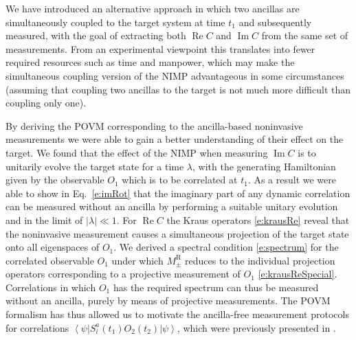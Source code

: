 \documentclass[epjST,numbook]{svjour}
\newcommand{\matel}[3]{ \displaystyle \left\langle #1 \right \vert #2 \left\vert  #3 \right\rangle }
\DeclareMathOperator{\imp }{\mathrm{Im}}
\DeclareMathOperator{\rep}{\mathrm{Re}}
\begin{document}
We have introduced an alternative approach in which two ancillas are simultaneously coupled to the target system at time $t_1$ and subsequently measured, with the goal of extracting both $\rep C$ and $\imp C$ from the same set of measurements. From an experimental viewpoint this translates into fewer required resources such as time and manpower, which may make the simultaneous coupling version of the NIMP advantageous in some circumstances (assuming that coupling two ancillas to the target is not much more difficult than coupling only one).

By deriving the POVM corresponding to the ancilla-based noninvasive measurements we were able to gain a better understanding of their effect on the target. We found that the effect of the NIMP when measuring $\imp C$ is to unitarily evolve the target state for a time $\lambda$, with the generating Hamiltonian given by the observable $O_1$ which is to be correlated at $t_1$. As a result we were able to show in Eq.~\eqref{e:imRot} that the imaginary part of any dynamic correlation can be measured without an ancilla by performing a suitable unitary evolution and in the limit of $|\lambda|\ll 1$.
For $\rep C$ the Kraus operators \eqref{e:krausRe} reveal that the noninvasive measurement causes a simultaneous projection of the target state onto all eigenspaces of $O_1$. We derived a spectral condition \eqref{e:spectrum} for the correlated observable $O_1$ under which $M_\pm^\text{R}$ reduces to the individual projection operators corresponding to a projective measurement of $O_1$ \eqref{e:krausReSpecial}. Correlations in which $O_1$ has the required spectrum can thus be measured without an ancilla, purely by means of projective measurements. The POVM formalism has thus allowed us to motivate the ancilla-free measurement protocols for correlations $\matel{\psi}{S_i^a(t_1)O_2(t_2)}{\psi}$, which were previously presented in \cite{Uhrich_etal}.
%
\end{document}

